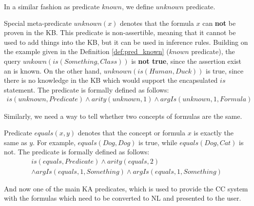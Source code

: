 In a similar fashion as predicate $known$, we define $unknown$ predicate.

\begin{definition}\label{def:pred_unknown}
Special meta-predicate $unknown(x)$ denotes that the formula $x$ can 
\textbf{not} be proven in the KB. This predicate is non-assertible, meaning that 
it cannot be used to add things into the KB, but it can be used in inference 
rules. Building on the example given in the Definition \ref{def:pred_known}
($known$ predicate), the query $unkown(is(Something,Class))$ is 
\textbf{not true}, since the assertion exist an is known. On the other hand,
$unknown(is(Human,Duck))$ is true, since there is no knowledge in the KB which
would support the encapsulated $is$ statement. The predicate is formally defined 
as follows:
\begin{equation}\label{as:unknown}
\begin{gathered}
	is(unknown,Predicate) \land arity(unknown,1) \land argIs(unknown,1,Formula)
\end{gathered}
\end{equation}
\end{definition}

Similarly, we need a way to tell whether two concepts of formulas are the same.
\begin{definition}\label{def:pred_equals}
Predicate $equals(x,y)$ denotes that the concept or formula $x$ is exactly 
the same as $y$. For example, $equals(Dog,Dog)$ is true, while 
$equals(Dog,Cat)$ is not. The predicate is formally defined as follows:
\begin{equation}\label{as:equals}
\begin{gathered}
	is(equals,Predicate) \land arity(equals,2)\\
 	\land argIs(equals,1,Something) \land argIs(equals,1,Something)
\end{gathered}
\end{equation}
\end{definition}

And now one of the main KA predicates, which is used to provide the CC system
with the formulas which need to be converted to NL and presented to the user.

